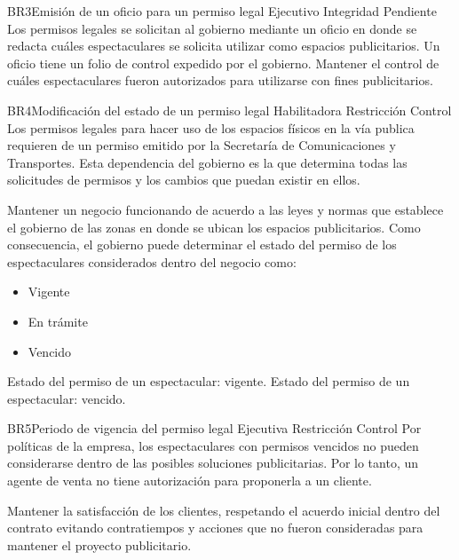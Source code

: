 \hypertarget{BR:BR3}{}
\begin{BussinesRule}{BR3}{Emisión de un oficio para un permiso legal}
    \BRitem[Tipo: ] Ejecutivo
    \BRitem[Clase:] Integridad
    \BRitem[Nivel:] Pendiente
    \BRitem[Descripción:] Los permisos legales se solicitan al gobierno mediante un oficio en donde se redacta cuáles espectaculares se solicita utilizar como espacios publicitarios. Un oficio tiene un folio de control expedido por el gobierno.
    \BRitem[Motivación:] Mantener el control de cuáles espectaculares fueron autorizados para utilizarse con fines publicitarios.
\end{BussinesRule}

\hypertarget{BR:BR4}{}
\begin{BussinesRule}{BR4}{Modificación del estado de un permiso legal}
    \BRitem[Tipo: ] Habilitadora
    \BRitem[Clase:] Restricción
    \BRitem[Nivel:] Control
    \BRitem[Descripción:] Los permisos legales para hacer uso de los espacios físicos en la vía publica requieren de un permiso emitido por la Secretaría de Comunicaciones y Transportes. Esta dependencia del gobierno es la que determina todas las solicitudes de permisos y los cambios que puedan existir en ellos.
    
    \BRitem[Motivación: ] Mantener un negocio funcionando de acuerdo a las leyes y normas que establece el gobierno de las zonas en donde se ubican los espacios publicitarios. Como consecuencia, el gobierno puede determinar el estado del permiso de los espectaculares considerados dentro del negocio como:
    \begin{itemize}
        \item Vigente
        \item En trámite
        \item Vencido
    \end{itemize}
     Estado del permiso de un espectacular: vigente.
     Estado del permiso de un espectacular: vencido.
\end{BussinesRule}

\hypertarget{BR:BR5}{}
\begin{BussinesRule}{BR5}{Periodo de vigencia del permiso legal}
    \BRitem[Tipo: ] Ejecutiva
    \BRitem[Clase:] Restricción
    \BRitem[Nivel:] Control
    \BRitem[Descripción:] Por políticas de la empresa, los espectaculares con permisos vencidos no pueden considerarse dentro de las posibles soluciones publicitarias. Por lo tanto, un agente de venta no tiene autorización para proponerla a un cliente.
    
    \BRitem[Motivación: ] Mantener la satisfacción de los clientes, respetando el acuerdo inicial dentro del contrato evitando contratiempos y acciones que no fueron consideradas para mantener el proyecto publicitario.
\end{BussinesRule}

